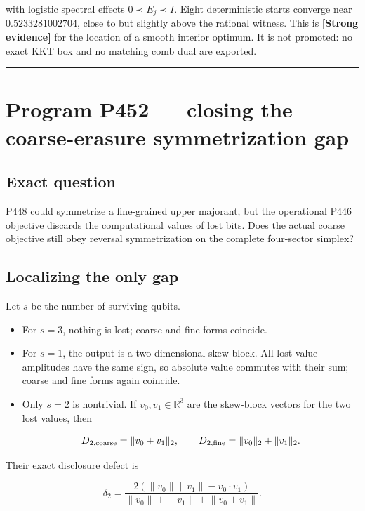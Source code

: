 \documentclass[11pt,a4paper,openany]{report}
\newcommand{\statusStrong}{\textcolor{finblue}{[Strong evidence]}}
\begin{document}
with logistic spectral effects \(0\prec E_j\prec I\). Eight deterministic starts converge near \(0.5233281002704\), close to but slightly above the rational witness. This is \textbf{\statusStrong{}} for the location of a smooth interior optimum. It is not promoted: no exact KKT box and no matching comb dual are exported.

\par\medskip\hrule\medskip

\chapter{Program P452 --- closing the coarse-erasure symmetrization gap}

\section{Exact question}

P448 could symmetrize a fine-grained upper majorant, but the operational P446 objective discards the computational values of lost bits. Does the actual coarse objective still obey reversal symmetrization on the complete four-sector simplex?

\section{Localizing the only gap}

Let \(s\) be the number of surviving qubits.

\begin{itemize}
\item 
For \(s=3\), nothing is lost; coarse and fine forms coincide.

\item 
For \(s=1\), the output is a two-dimensional skew block. All lost-value amplitudes have the same sign, so absolute value commutes with their sum; coarse and fine forms again coincide.

\item 
Only \(s=2\) is nontrivial. If \(v_0,v_1\in\mathbb R^3\) are the skew-block vectors for the two lost values, then

\[
  D_{2,\rm coarse}=\lVert v_0+v_1\rVert_2,
  \qquad
  D_{2,\rm fine}=\lVert v_0\rVert_2+\lVert v_1\rVert_2.
  \]

\end{itemize}

Their exact disclosure defect is

\[
\delta_2=
\frac{2(\lVert v_0\rVert\lVert v_1\rVert-v_0\cdot v_1)}
{\lVert v_0\rVert+\lVert v_1\rVert+\lVert v_0+v_1\rVert}.
\]
\end{document}
